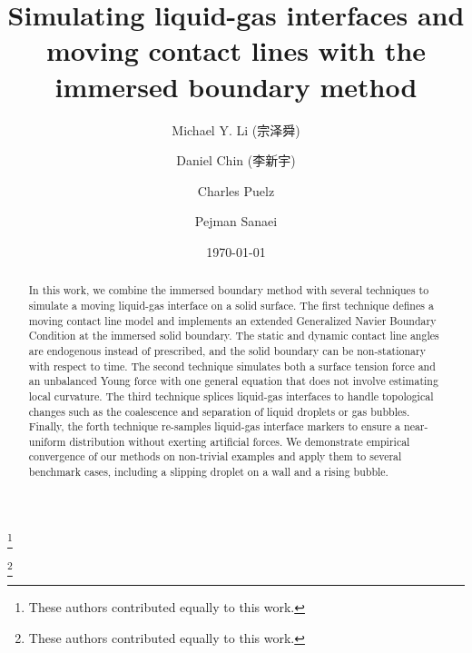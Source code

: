 \documentclass[%
 aip,
 amsmath,amssymb,
 reprint,
 floatfix
]{revtex4-1}
\begin{document}

\begin{CJK*}{UTF8}{} %

\title[]{Simulating liquid-gas interfaces and moving contact lines with the immersed boundary method}

\author{Michael Y. Li (宗泽舜)}
\thanks{These authors contributed equally to this work.}
\author{Daniel Chin (李新宇)}%
\thanks{These authors contributed equally to this work.}

\author{Charles Puelz}

\author{Pejman Sanaei}

\date{\today}%

\begin{abstract}
In this work, we combine the immersed boundary method with several techniques to simulate a moving liquid-gas interface on a solid surface. The first technique defines a moving contact line model and implements an extended Generalized Navier Boundary Condition at the immersed solid boundary. The static and dynamic contact line angles are endogenous instead of prescribed, and the solid boundary can be non-stationary with respect to time. The second technique simulates both a surface tension force and an unbalanced Young force with one general equation that does not involve estimating local curvature. The third technique splices liquid-gas interfaces to handle topological changes such as the coalescence and separation of liquid droplets or gas bubbles. Finally, the forth technique re-samples liquid-gas interface markers to ensure a near-uniform distribution without exerting artificial forces. We demonstrate empirical convergence of our methods on non-trivial examples and apply them to several benchmark cases, including a slipping droplet on a wall and a rising bubble.
\end{abstract}

\maketitle

\end{CJK*}
\end{document}
